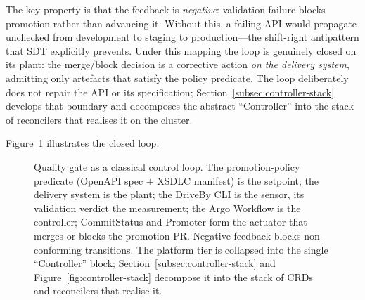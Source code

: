 \begin{table}[htbp]
\centering
\caption{Control theory mapping to DriveBy quality gate components.}
\label{tab:control-mapping}
\small
{}
\end{table}

The key property is that the feedback is \textit{negative}: validation failure blocks promotion rather than advancing it. Without this, a failing API would propagate unchecked from development to staging to production---the shift-right antipattern that SDT explicitly prevents. Under this mapping the loop is genuinely closed on its plant: the merge/block decision is a corrective action \textit{on the delivery system}, admitting only artefacts that satisfy the policy predicate. The loop deliberately does not repair the API or its specification; Section~\ref{subsec:controller-stack} develops that boundary and decomposes the abstract ``Controller'' into the stack of reconcilers that realises it on the cluster.

Figure~\ref{fig:quality-control-loop} illustrates the closed loop.

\begin{figure}[htbp]
\centering
\resizebox{\textwidth}{!}{%
%
}
\caption{Quality gate as a classical control loop. The promotion-policy predicate (OpenAPI spec $+$ XSDLC manifest) is the setpoint; the delivery system is the plant; the DriveBy CLI is the sensor, its validation verdict the measurement; the Argo Workflow is the controller; CommitStatus and Promoter form the actuator that merges or blocks the promotion PR. Negative feedback blocks non-conforming transitions. The platform tier is collapsed into the single ``Controller'' block; Section~\ref{subsec:controller-stack} and Figure~\ref{fig:controller-stack} decompose it into the stack of CRDs and reconcilers that realise it.}
\label{fig:quality-control-loop}
\end{figure}

